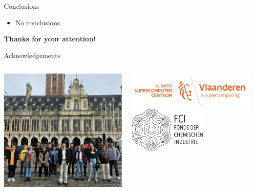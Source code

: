 \documentclass[9pt,t,xcolor=table]{beamer}
\begin{document}
\begin{frame}{\huge Conclusions}\large
	\begin{itemize}
		\item No conclusions
	\end{itemize}
	\centering
	\vspace{40pt}
	\Huge \textcolor{kul-blue}{\textbf{Thanks for your attention!}}
\end{frame}

\begin{frame}{\huge Acknowledgements}\large
	\centering
	\begin{columns}
		\begin{column}[c]{0.7\textwidth}
			\centering
			\includegraphics[width=\textwidth]{Figs/TJ.jpeg}
		\end{column}
		\begin{column}[c]{0.3\textwidth}
			\centering
			\includegraphics[width=\textwidth]{Figs/VSC-Combilogo.png}\\\vfill
			\includegraphics[width=0.6\textwidth]{Figs/FCI.png}\\\vfill

\end{column}
\end{columns}
\end{frame}
\end{document}
